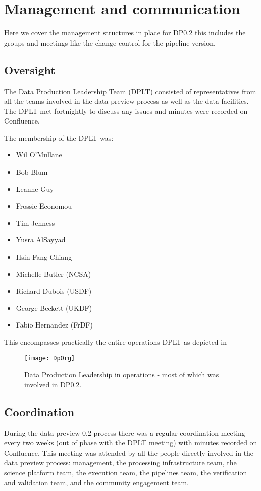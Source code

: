\section{Management and communication} \label{sec:management}

Here we cover the management structures in place for DP0.2 this includes the groups and meetings like the change control for the pipeline version.

\subsection{Oversight}

The Data Production Leadership Team (DPLT) consisted of representatives from all the teams involved in the data preview process as well as the data facilities.
The DPLT met fortnightly to discuss any issues and minutes were recorded on Confluence.

The membership of the DPLT was:

\begin{itemize}
\item Wil O'Mullane
\item Bob Blum
\item Leanne Guy
\item Frossie Economou
\item Tim Jenness
\item Yusra AlSayyad
\item Hsin-Fang Chiang
\item Michelle Butler (NCSA)
\item Richard Dubois (USDF)
\item George Beckett (UKDF)
\item Fabio Hernandez (FrDF)
\end{itemize}

This encompasses practically the entire operations DPLT as depicted in 

\begin{figure}
\texttt{[image: DpOrg]}
\caption{Data Production Leadership in operations - most of which was involved in DP0.2. \label{fig:DpOrg}}
\end{figure}

\subsection{Coordination}

During the data preview 0.2 process there was a regular coordination meeting every two weeks (out of phase with the DPLT meeting) with minutes recorded on Confluence.
This meeting was attended by all the people directly involved in the data preview process: management, the processing infrastructure team, the science platform team, the execution team, the pipelines team, the verification and validation team, and the community engagement team.

